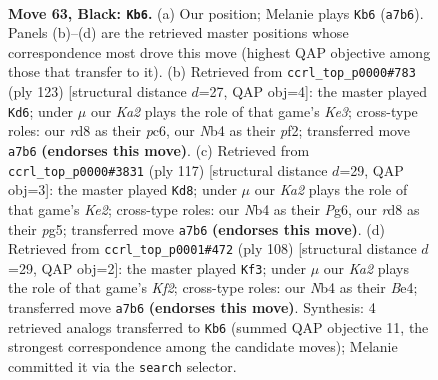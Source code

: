 \documentclass[11pt]{article}
\begin{document}
\clearpage

\begin{figure}[p]\centering
\begin{subfigure}{0.46\textwidth}\centering
\resizebox{\linewidth}{!}{%
\newchessgame
\chessboard[
  setfen={3R4/kp5p/6pP/p4p2/1n3P2/1r6/7K/4R3 b - - 14 63},
  showmover=false,
  pgfstyle=straightmove, color=movearrow, markmove={a7-b6}
]}
\caption{}
\end{subfigure}\hfill
\begin{subfigure}{0.46\textwidth}\centering
\resizebox{\linewidth}{!}{%
\newchessgame
\chessboard[
  setfen={8/8/p1P1k1p1/P4p1p/3K3P/5p2/5P2/8 b - - 0 62},
  showmover=false,
  pgfstyle=straightmove, color=movearrow, markmove={e6-d6}
]}
\caption{}
\end{subfigure}
\\[4pt]
\begin{subfigure}{0.46\textwidth}\centering
\resizebox{\linewidth}{!}{%
\newchessgame
\chessboard[
  setfen={8/2p1k3/1p1p2p1/1P1P2P1/7p/P4K2/8/8 b - - 2 59},
  showmover=false,
  pgfstyle=straightmove, color=movearrow, markmove={e7-d8}
]}
\caption{}
\end{subfigure}\hfill
\begin{subfigure}{0.46\textwidth}\centering
\resizebox{\linewidth}{!}{%
\newchessgame
\chessboard[
  setfen={8/4k1p1/7p/4P2P/4BP2/6P1/5K2/r7 w - - 23 55},
  showmover=false,
  pgfstyle=straightmove, color=movearrow, markmove={f2-f3}
]}
\caption{}
\end{subfigure}
\caption{\textbf{Move 63, Black: \texttt{Kb6}.} (a) Our position; Melanie plays \texttt{Kb6} (\texttt{a7b6}). Panels (b)--(d) are the retrieved master positions whose correspondence most drove this move (highest QAP objective among those that transfer to it). (b) Retrieved from \texttt{ccrl\_top\_p0000\#783} (ply 123) [structural distance $d$=27, QAP obj=4]: the master played \texttt{Kd6}; under $\mu$ our \emph{Ka2} plays the role of that game's \emph{Ke3}; cross-type roles: our \emph{r}d8 as their \emph{p}c6, our \emph{N}b4 as their \emph{p}f2; transferred move \texttt{a7b6} \textbf{(endorses this move)}. (c) Retrieved from \texttt{ccrl\_top\_p0000\#3831} (ply 117) [structural distance $d$=29, QAP obj=3]: the master played \texttt{Kd8}; under $\mu$ our \emph{Ka2} plays the role of that game's \emph{Ke2}; cross-type roles: our \emph{N}b4 as their \emph{P}g6, our \emph{r}d8 as their \emph{p}g5; transferred move \texttt{a7b6} \textbf{(endorses this move)}. (d) Retrieved from \texttt{ccrl\_top\_p0001\#472} (ply 108) [structural distance $d$=29, QAP obj=2]: the master played \texttt{Kf3}; under $\mu$ our \emph{Ka2} plays the role of that game's \emph{Kf2}; cross-type roles: our \emph{N}b4 as their \emph{B}e4; transferred move \texttt{a7b6} \textbf{(endorses this move)}. Synthesis: 4 retrieved analogs transferred to \texttt{Kb6} (summed QAP objective 11, the strongest correspondence among the candidate moves); Melanie committed it via the \texttt{search} selector.}
\label{fig:thought-m125}
\end{figure}
\end{document}
